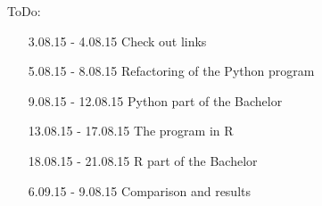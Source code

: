 \documentclass{article}
\begin{document}
ToDo:
\begin{enumerate}
    \item[3.08.15 - 4.08.15] Check out links
    \item[5.08.15 - 8.08.15] Refactoring of the Python program
    \item[9.08.15 - 12.08.15] Python part of the Bachelor
    \item[13.08.15 - 17.08.15] The program in R
    \item[18.08.15 - 21.08.15] R part of the Bachelor
    \item[6.09.15 - 9.08.15] Comparison and results
\end{enumerate}
\end{document}
